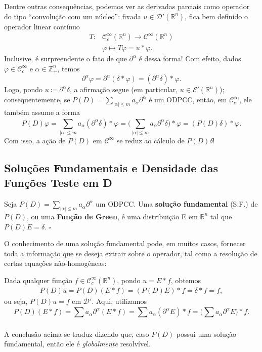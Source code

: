 \documentclass[../distribution_theory_notes.tex]{subfiles}
\begin{document}
Dentre outras consequências, podemos ver as derivadas parciais como operador do tipo ``convolução com um núcleo'': fixada \(u\in \mathcal{D}'(\mathbb{R}^{n})\), fica bem definido o operador linear contínuo
\begin{align*}
	T: & \mathcal{C}_{c}^{\infty}(\mathbb{R}^{n})\rightarrow \mathcal{C}^{\infty}(\mathbb{R}^{n}) \\
	   & \varphi \longmapsto T\varphi = u*\varphi .
\end{align*}
Inclusive, é surpreendente o fato de que \(\partial^{\alpha }\) é dessa forma! Com efeito, dados \(\varphi \in \mathcal{C}_{c}^{\infty}\) e \(\alpha \in \mathbb{Z}_{+}^{n}\), temos
\[
	\partial^{\alpha }\varphi  = \partial^{\alpha }(\delta *\varphi ) = (\partial^{\alpha }\delta )*\varphi.
\]
Logo, pondo \(u\coloneqq \partial^{\alpha }\delta \), a afirmação segue (em particular, \(u\in \mathcal{E}'(\mathbb{R}^{n})\)); consequentemente, se \(P(D)=\sum\limits_{| \alpha  |\leq m}^{}a_{\alpha }\partial^{\alpha }\) é um ODPCC, então, em \(\mathcal{C}_{c}^{\infty}\), ele também assume a forma
\[
	P(D)\varphi  = \sum\limits_{| \alpha  |\leq m}^{}a_{\alpha }(\partial^{\alpha }\delta )*\varphi = \biggl(\sum\limits_{| \alpha  |\leq m}^{}a_{\alpha }\partial^{\alpha }\delta \biggr)*\varphi = (P(D)\delta )*\varphi .
\]
Com isso, a ação de \(P(D)\) em \(\mathcal{C}^{\infty}\) se reduz ao cálculo de \(P(D)\delta !\)

\subsection{Soluções Fundamentais e Densidade das Funções Teste em D}
\begin{def*}
	Seja \(P(D)=\sum\limits_{| \alpha  |\leq m}^{}a_{\alpha }\partial^{\alpha }\) um ODPCC. Uma \textbf{solução fundamental} (S.F.) de \(P(D)\), ou uma \textbf{Função de Green}, é uma distribuição E em \(\mathbb{R}^{n}\) tal que \(P(D)E = \delta .\; \square\)
\end{def*}
O conhecimento de uma solução fundamental pode, em muitos casos, fornecer toda a informação que se deseja extrair sobre o operador, tal como a resolução de certas equações não-homogêneas:
\begin{example}
	Dada qualquer função \(f\in \mathcal{C}_{c}^{\infty}(\mathbb{R}^{n})\), pondo \(u = E * f\), obtemos
	\begin{align*}
		P(D)u = P(D)(E*f)= (P(D)E)*f = \delta * f = f,
	\end{align*}
	ou seja, \(P(D)u = f\) em \(\mathcal{D}'.\) Aqui, utilizamos
	\[
		P(D)(E*f)=\sum\limits_{}^{}a_{\alpha }\partial^{\alpha }(E*f) = \sum\limits_{}^{}a_{\alpha }(\partial^{\alpha }E)*f = \biggl(\sum\limits_{}^{}a_{\alpha }\partial^{\alpha }E\biggr)*f.
	\]
\end{example}
\begin{tcolorbox}[
		skin=enhanced,
		title=Observação,
		fonttitle=\bfseries,
		colframe=black,
		colbacktitle=cyan!75!white,
		colback=cyan!15,
		colbacklower=black,
		coltitle=black,
		drop fuzzy shadow,
	]
	A conclusão acima se traduz dizendo que, caso \(P(D)\) possui uma solução fundamental, então ele é \textit{globalmente} resolvível.
\end{tcolorbox}
\end{document}
